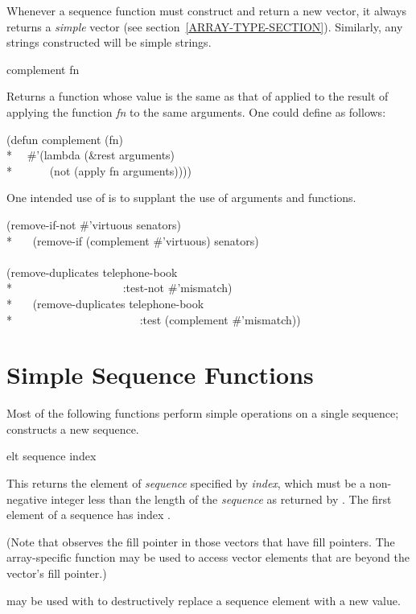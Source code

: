 Whenever a sequence function must construct and return
a new vector, it always returns a \emph{simple}
vector (see section~\ref{ARRAY-TYPE-SECTION}).
Similarly, any strings constructed will be simple strings.

\begin{defun}[Function]
complement fn

Returns a function whose value is the same as that of 
applied to the result of applying the function \emph{fn} to the same
arguments.  One could define  as follows:
\begin{lisp}
(defun complement (fn) \\*
~~\#'(lambda (\&rest arguments) \\*
~~~~~~(not (apply fn arguments))))
\end{lisp}

One intended use of  is to supplant the use of
 arguments and  functions.
\begin{lisp}
(remove-if-not \#'virtuous senators) {\EQ} \\*
~~~(remove-if (complement \#'virtuous) senators) \\
\\
(remove-duplicates telephone-book \\*
~~~~~~~~~~~~~~~~~~~:test-not \#'mismatch) {\EQ} \\*
~~~(remove-duplicates telephone-book \\*
~~~~~~~~~~~~~~~~~~~~~~:test (complement \#'mismatch))
\end{lisp}
\end{defun}

\section{Simple Sequence Functions}

Most of the following functions perform simple operations on a single
sequence;  constructs a new sequence.

\begin{defun}[Function]
elt sequence index

This returns the element of \emph{sequence} specified by \emph{index},
which must be a non-negative integer less than the length of the \emph{sequence}
as returned by .
The first element of a sequence has index .

(Note that  observes the fill pointer in those vectors that have
fill pointers.  The array-specific function  may be used
to access vector elements that are beyond the vector's fill pointer.)

 may be used with  to destructively replace
a sequence element with a new value.
\end{defun}

